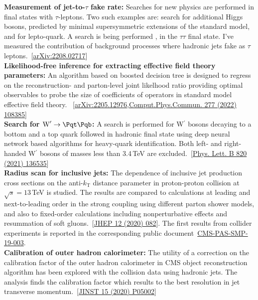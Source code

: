 \documentclass[a4paper,11pt]{article}
\newcommand{\Pb}{{{\Pqb}}\xspace}
\newcommand{\Pt}{{{\Pqt}}\xspace}
\begin{document}
{\textbf{Measurement of jet-to-$\tau$ fake rate:}
Searches for new physics are performed in final states with $\tau$-leptons. Two such examples are: search for additional Higgs bosons, predicted by minimal supersymmetric extensions of the standard model, and for lepto-quark.
A search is being performed , in the $\tau\tau$ final state. I've measured the contribution of background processes where hadronic jets fake as $\tau$ leptons.~[\href{https://arxiv.org/abs/2208.02717}{arXiv:2208.02717}]\\
\textbf{Likelihood-free inference for extracting effective field theory parameters:}
An algorithm based on boosted decision tree is designed to regress on the reconstruction- and parton-level joint likelhood ratio providing optimal observables to probe the size of coefficients of operators in standard model effective field theory.
~[\href{https://arxiv.org/abs/2205.12976}{arXiv:2205.12976},\href{https://doi.org/10.1016/j.cpc.2022.108385}{Comput.Phys.Commun. 277 (2022) 108385}]\\
\textbf{Search for $\textrm{W}^\prime \rightarrow \Pt \Pb$:}
A search is performed for W$^\prime$ bosons decaying to a bottom and a top quark followed in hadronic final state using deep neural network based algorithms for heavy-quark identification.
Both left- and right-handed W$^\prime$ bosons of masses less than 3.4\,TeV are excluded.~[\href{https://doi.org/10.1016/j.physletb.2021.136535}{Phys. Lett. B 820 (2021) 136535}]\\
\textbf{Radius scan for inclusive jets:}
The dependence of inclusive jet production cross sections on the anti-$k_{\mathrm{T}}$ distance parameter in proton-proton collision at $\sqrt{s}=13$\,TeV is studied. The results are compared to calculations at leading and next-to-leading order in the strong coupling using different parton shower models, and also to fixed-order calculations including nonperturbative effects and resummation of soft gluons.~[\href{https://doi.org/10.1007/JHEP12(2020)082}{JHEP 12 (2020) 082}]. The first results from collider experiments is reported in the corresponding public document~\href{http://cds.cern.ch/record/2682598?ln=en}{CMS-PAS-SMP-19-003}.\\
\textbf{Calibration of outer hadron calorimeter:}
The utility of a correction on the calibration factor of the outer hadron calorimeter in CMS object reconstruction algorithm  has been explored with the collision data using hadronic jets. The analysis finds the calibration factor which results to the best resolution in jet transverse momentum.~[\href{https://doi.org/10.1088/1748-0221/15/05/P05002}{JINST 15 (2020) P05002}]\\
}
\end{document}
